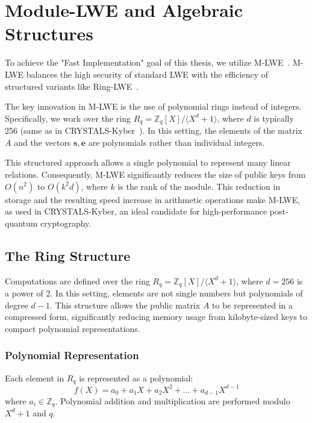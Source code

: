 \section{Module-LWE and Algebraic Structures}
\label{sec:m_lwe_structures}

To achieve the "Fast Implementation" goal of this thesis, we utilize M-LWE~\cite{langlois2015worst}. M-LWE balances the high security of standard LWE with the efficiency of structured variants like Ring-LWE~\cite{LyubashevskyPR13}.

The key innovation in M-LWE is the use of polynomial rings instead of integers.
Specifically, we work over the ring $R_q = \mathbb{Z}_q[X] / \langle X^d + 1 \rangle$, where $d$ is typically 256 (same as in CRYSTALS-Kyber~\cite[page 4]{kyber_spec_2021}).
In this setting, the elements of the matrix $A$ and the vectors $\mathbf{s}, \mathbf{e}$ are polynomials rather than individual integers.

This structured approach allows a single polynomial to represent many linear relations.
Consequently, M-LWE significantly reduces the size of public keys from $O(n^2)$ to $O(k^2 d)$, where $k$ is the rank of the module.
This reduction in storage and the resulting speed increase in arithmetic operations make M-LWE, as used in CRYSTALS-Kyber, an ideal candidate for high-performance post-quantum cryptography.

\subsection{The Ring Structure}
\label{subsec:the-ring-structure}
Computations are defined over the ring $R_q = \mathbb{Z}_q[X] / \langle X^d + 1 \rangle$, where $d=256$ is a power of 2.
In this setting, elements are not single numbers but polynomials of degree $d-1$.
This structure allows the public matrix $A$ to be represented in a compressed form, significantly reducing memory usage from kilobyte-sized keys to compact polynomial representations.

\subsubsection{Polynomial Representation}
Each element in $R_q$ is represented as a polynomial:
\begin{equation}
    f(X) = a_0 + a_1 X + a_2 X^2 + \dots + a_{d-1} X^{d-1}
\end{equation}
where $a_i \in \mathbb{Z}_q$.
Polynomial addition and multiplication are performed modulo $X^d + 1$ and $q$.

